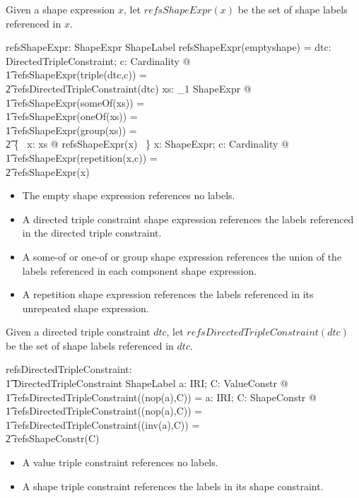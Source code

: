 \documentclass{article}
\begin{document}
Given a shape expression $x$, let $refsShapeExpr(x)$ be the set of shape labels referenced in $x$.
\begin{axdef}
	refsShapeExpr: ShapeExpr \fun \finset ShapeLabel
\where
	refsShapeExpr(emptyshape) = \emptyset
\also
	\forall dtc: DirectedTripleConstraint; c: Cardinality @ \\
\t1		refsShapeExpr(triple(dtc,c)) = \\
\t2			refsDirectedTripleConstraint(dtc)
\also
	\forall xs: \seq_1 ShapeExpr @ \\
\t1		refsShapeExpr(someOf(xs)) = \\
\t1		refsShapeExpr(oneOf(xs)) = \\
\t1		refsShapeExpr(group(xs)) = \\
\t2			\bigcup \{~ x: \ran xs @ refsShapeExpr(x) ~\}
\also
	\forall x: ShapeExpr; c: Cardinality @ \\
\t1		refsShapeExpr(repetition(x,c)) = \\
\t2			refsShapeExpr(x)
\end{axdef}
\begin{itemize}
\item The empty shape expression references no labels.
\item A directed triple constraint shape expression references the labels referenced in the directed triple constraint.
\item A some-of or one-of or group shape expression references the union of the labels referenced in each component shape expression.
\item A repetition shape expression references the labels referenced in its unrepeated shape expression.
\end{itemize}

Given a directed triple constraint $dtc$, let $refsDirectedTripleConstraint(dtc)$ be the set of shape labels referenced in $dtc$.
\begin{axdef}
	refsDirectedTripleConstraint: \\
\t1		DirectedTripleConstraint \fun \finset ShapeLabel
\where
	\forall a: IRI; C: ValueConstr @ \\
\t1		refsDirectedTripleConstraint((nop(a),C)) = \emptyset
\also
	\forall a: IRI; C: ShapeConstr @ \\
\t1		refsDirectedTripleConstraint((nop(a),C)) = \\
\t1		refsDirectedTripleConstraint((inv(a),C)) = \\
\t2			refsShapeConstr(C)
\end{axdef}
\begin{itemize}
\item A value triple constraint references no labels.
\item A shape triple constraint references the labels in its shape constraint.
\end{itemize}
\end{document}
